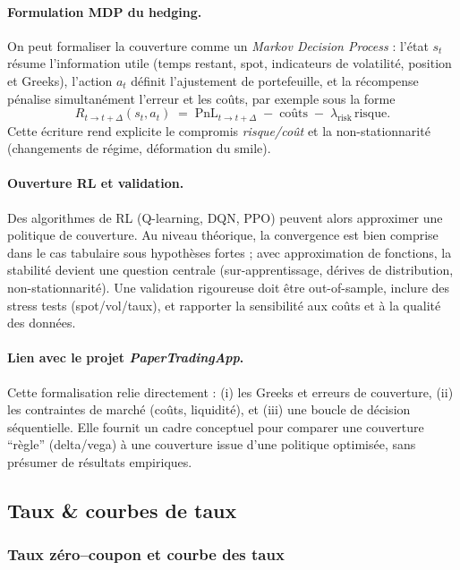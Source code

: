 \documentclass[11pt,a4paper]{article}
\newcommand{\1}{\mathbf{1}}
\begin{document}
\paragraph{Formulation MDP du hedging.}
On peut formaliser la couverture comme un \emph{Markov Decision Process} : l'\'etat $s_t$ r\'esume l'information utile
(temps restant, spot, indicateurs de volatilité, position et Greeks), l'action $a_t$ d\'efinit l'ajustement de portefeuille,
et la r\'ecompense p\'enalise simultan\'ement l'erreur et les co\^uts, par exemple sous la forme
\[
R_{t\to t+\Delta}(s_t,a_t) \;=\; \mathrm{PnL}_{t\to t+\Delta} \;-\; \text{co\^uts} \;-\; \lambda_{\mathrm{risk}}\,\text{risque}.
\]
Cette \'ecriture rend explicite le compromis \emph{risque/co\^ut} et la non-stationnarit\'e (changements de r\'egime, d\'eformation du smile).

\paragraph{Ouverture RL et validation.}
Des algorithmes de RL (Q-learning, DQN, PPO) peuvent alors approximer une politique de couverture. Au niveau th\'eorique, la convergence
est bien comprise dans le cas tabulaire sous hypoth\`eses fortes ; avec approximation de fonctions, la stabilit\'e devient une question
centrale (sur-apprentissage, d\'erives de distribution, non-stationnarit\'e). Une validation rigoureuse doit \^etre out-of-sample,
inclure des stress tests (spot/vol/taux), et rapporter la sensibilit\'e aux co\^uts et \`a la qualit\'e des donn\'ees.

\paragraph{Lien avec le projet \emph{PaperTradingApp}.}
Cette formalisation relie directement : (i) les Greeks et erreurs de couverture, (ii) les contraintes de march\'e (co\^uts, liquidit\'e),
et (iii) une boucle de d\'ecision s\'equentielle. Elle fournit un cadre conceptuel pour comparer une couverture ``r\`egle'' (delta/vega)
\`a une couverture issue d'une politique optimis\'ee, sans pr\'esumer de r\'esultats empiriques.

\subsection{Taux \& courbes de taux}

\subsubsection{Taux z\'ero--coupon et courbe des taux}
\end{document}
